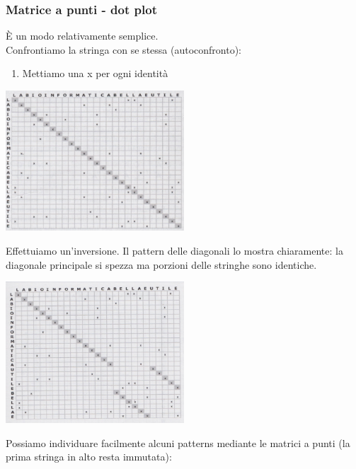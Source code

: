 \documentclass{article}
\begin{document}
\subsubsection{Matrice a punti - dot plot}
È un modo relativamente semplice.\\
Confrontiamo la stringa con se stessa (autoconfronto):
\begin{enumerate}
    \item Mettiamo una x per ogni identità
\end{enumerate}
\begin{center}
    \includegraphics[width=0.5\textwidth]{figures/autoconfronto.png}
\end{center}
Effettuiamo un'inversione. Il pattern delle diagonali lo
mostra chiaramente: la diagonale principale si spezza ma
porzioni delle stringhe sono identiche.
\begin{center}
    \includegraphics[width=0.5\textwidth]{figures/inversione.png}
\end{center}
Possiamo individuare facilmente alcuni patterns mediante le matrici a punti (la prima stringa in alto resta immutata):
\end{document}
